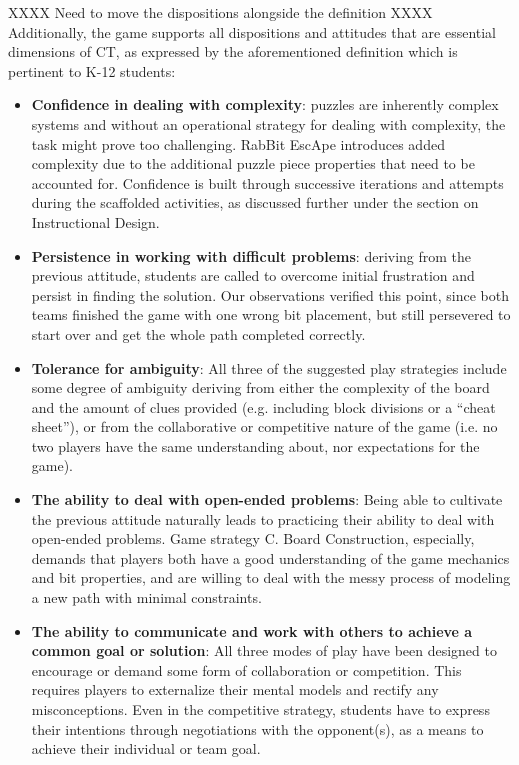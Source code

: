 \documentclass{acm_proc_article-sp}
\begin{document}
XXXX Need to move the dispositions alongside the definition XXXX
Additionally, the game supports all dispositions and attitudes that are essential dimensions of CT, as expressed by the aforementioned definition which is pertinent to K-12 students:
\begin{itemize}
       \item \textbf{Confidence in dealing with complexity}:
       puzzles are inherently complex systems and without an operational strategy for dealing with complexity, the task might prove too challenging.
       RabBit EscApe introduces added complexity due to the additional puzzle piece properties that need to be accounted for.
       Confidence is built through successive iterations and attempts during the scaffolded activities, as discussed further under the section on Instructional Design.
       \item \textbf{Persistence in working with difficult problems}:
       deriving from the previous attitude, students are called to overcome initial frustration and persist in finding the solution. Our observations verified this point, since both teams finished the game with one wrong bit placement, but still persevered to start over and get the whole path completed correctly.
       \item \textbf{Tolerance for ambiguity}: 
       All three of the suggested play strategies include some degree of ambiguity deriving from either the complexity of the board and the amount of clues provided (e.g. including block divisions or a ``cheat sheet''), or from the collaborative or competitive nature of the game (i.e. no two  players have the same understanding about, nor expectations for the game). 
       \item \textbf{The ability to deal with open-ended problems}: Being able to cultivate the previous attitude naturally leads to practicing their ability to deal with open-ended problems. Game strategy C. Board Construction, especially, demands that players both have a good understanding of the game mechanics and bit properties, and are willing to deal with the messy process of modeling a new path with minimal constraints.
       \item \textbf{The ability to communicate and work with others to achieve a common goal or solution}:
       All three modes of play have been designed to encourage or demand some form of collaboration or competition.
       This requires players to externalize their mental models and rectify any misconceptions.
       Even in the competitive strategy, students have to express their intentions through negotiations with the opponent(s), as a means to achieve their individual or team goal.
\end{itemize}
\end{document}
